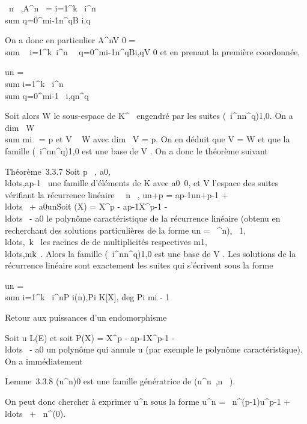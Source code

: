 \forall~n \in {}~,\quad A^n~ =
\sum i=1^k\lambda~ i^n~
\\sum
q=0^mi-1n^qB i,q

On a donc en particulier A^nV 0
= \\sum ~
i=1^k\lambda~i^n\
\sum ~
q=0^mi-1n^qBi,qV
0 et en prenant la première coordonnée,

un = \\sum
i=1^k\lambda~ i^n \\sum
q=0^mi-1\alpha~ i,qn^q

Soit alors W le sous-espace de K^~ engendré par les suites
(\lambda~i^nn^q)1\leqi\leqk,0\leqq\leqmi-1.
On a dim~ W
\leq\\sum  mi~ = p
et V \subset~ W avec dim~ V = p. On en déduit que V =
W et que la famille
(\lambda~i^nn^q)1\leqi\leqk,0\leqq{}
est une base de V . On a donc le théorème suivant

Théorème~3.3.7 Soit p \in {}~,
a0,\\ldots,ap-1~
une famille d'éléments de K avec
a0\neq~0, et V l'espace des suites
vérifiant la récurrence linéaire \forall~~n \in {}~,
un+p = ap-1un+p-1 +
\\ldots~ +
a0un\. Soit \chi(X) = X^p -
ap-1X^p-1
-\\ldots~ -
a0 le polynôme caractéristique de la récurrence linéaire
(obtenu en recherchant des solutions particulières de la forme
un = \lambda~^n),
\lambda~1,\\ldots,\lambda~k~
les racines de \chi de multiplicités respectives
m1,\\ldots,mk~.
Alors la famille
(\lambda~i^nn^q)1\leqi\leqk,0\leqq{}
est une base de V . Les solutions de la récurrence linéaire sont
exactement les suites qui s'écrivent sous la forme

un = \\sum
i=1^k\lambda~ i^nP
i(n),\quad Pi \in K{[}X{]}, deg Pi \leq
mi - 1

Retour aux puissances d'un endomorphisme

Soit u \in L(E) et soit P(X) = X^p -
ap-1X^p-1
-\\ldots~ -
a0 un polynôme qui annule u (par exemple le polynôme
caractéristique). On a immédiatement

Lemme~3.3.8 (u^n)0\leqn{} est une famille
génératrice de
\mathrmVect(u^n~,n
\in {}~).

On peut donc chercher à exprimer u^n sous la forme
u^n = \alpha~n^(p-1)u^p-1 +
\\ldots~ +
\alpha~n^(0)\mathrmId.

